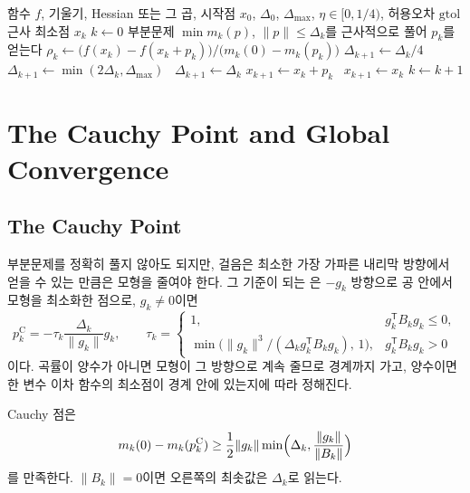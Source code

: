 \begin{algorithm}[t]
\begin{algorithmic}[1]
\Require 함수 $f$, 기울기, Hessian 또는 그 곱, 시작점 $x_0$, $\Delta_0$, $\Delta_{\max}$, $\eta\in[0,1/4)$, 허용오차 $\mathrm{gtol}$
\Ensure 근사 최소점 $x_k$
\State $k\gets0$
  \State 부분문제 $\min m_k(p)$, $\|p\|\le\Delta_k$를 근사적으로 풀어 $p_k$를 얻는다
  \State $\rho_k\gets\bigl(f(x_k)-f(x_k+p_k)\bigr)/\bigl(m_k(0)-m_k(p_k)\bigr)$
   $\Delta_{k+1}\gets\Delta_k/4$
   $\Delta_{k+1}\gets\min(2\Delta_k,\Delta_{\max})$
  \Else\ $\Delta_{k+1}\gets\Delta_k$
  \EndIf
   $x_{k+1}\gets x_k+p_k$ \Else\ $x_{k+1}\gets x_k$ \EndIf
  \State $k\gets k+1$
\EndWhile
\end{algorithmic}
\caption{신뢰 영역 방법}
\label{alg:trust-region}
\end{algorithm}

\section{The Cauchy Point and Global Convergence}
\label{sec:tr-cauchy}

\subsection{The Cauchy Point}

부분문제를 정확히 풀지 않아도 되지만, 걸음은 최소한 가장 가파른 내리막 방향에서 얻을 수 있는 만큼은 모형을 줄여야 한다. 그 기준이 되는 은 $-g_k$ 방향으로 공 안에서 모형을 최소화한 점으로, $g_k\ne0$이면
\[
p_k^{\mathrm C}=-\tau_k\frac{\Delta_k}{\|g_k\|}g_k,\qquad
\tau_k=\begin{cases}1,&g_k^{\mathsf T}B_kg_k\le0,\\\min\bigl(\|g_k\|^3/(\Delta_kg_k^{\mathsf T}B_kg_k),\,1\bigr),&g_k^{\mathsf T}B_kg_k>0\end{cases}
\]
이다. 곡률이 양수가 아니면 모형이 그 방향으로 계속 줄므로 경계까지 가고, 양수이면 한 변수 이차 함수의 최소점이 경계 안에 있는지에 따라 정해진다.

\begin{lemma}
\label{lem:cauchy-decrease}
Cauchy 점은
\[
m_k(0)-m_k(p_k^{\mathrm C})\ge\frac12\|g_k\|\min\Bigl(\Delta_k,\frac{\|g_k\|}{\|B_k\|}\Bigr)
\]
를 만족한다. $\|B_k\|=0$이면 오른쪽의 최솟값은 $\Delta_k$로 읽는다.
\end{lemma}

